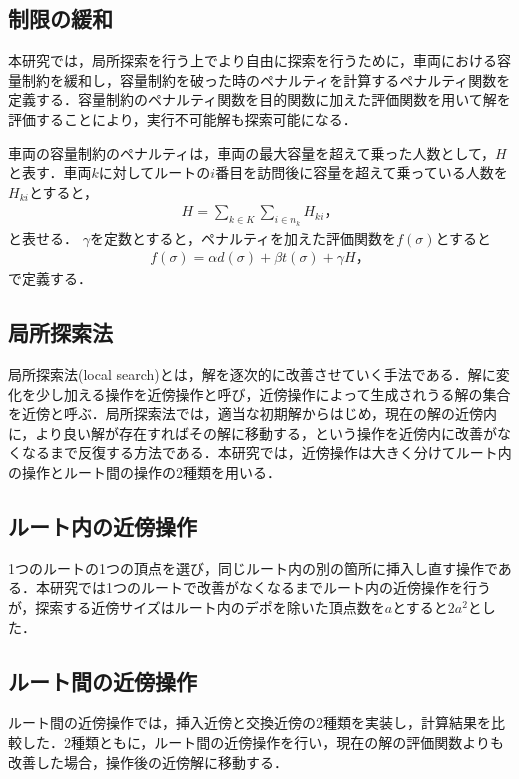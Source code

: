 \documentclass[a4j,11pt,twocolumn]{jsarticle}
\begin{document}
\subsection{{\large 制限の緩和}}
本研究では，局所探索を行う上でより自由に探索を行うために，車両における容量制約を緩和し，容量制約を破った時のペナルティを計算するペナルティ関数を定義する．容量制約のペナルティ関数を目的関数に加えた評価関数を用いて解を評価することにより，実行不可能解も探索可能になる．

車両の容量制約のペナルティは，車両の最大容量を超えて乗った人数として，$H$と表す．車両$k$に対してルートの$i$番目を訪問後に容量を超えて乗っている人数を$H_{ki}$とすると，
\begin{align*}
  H = \sum_{k \in K}\sum_{i \in n_k} H_{ki}，
\end{align*}
と表せる．
$\gamma$を定数とすると，ペナルティを加えた評価関数を$f(\sigma)$とすると
\begin{align*}
  f(\sigma) = \alpha d(\sigma)+ \beta t(\sigma) + \gamma H，
\end{align*}
で定義する．

\subsection{{\large 局所探索法}}
局所探索法(local search)とは，解を逐次的に改善させていく手法である．解に変化を少し加える操作を近傍操作と呼び，近傍操作によって生成されうる解の集合を近傍と呼ぶ．局所探索法では，適当な初期解からはじめ，現在の解の近傍内に，より良い解が存在すればその解に移動する，という操作を近傍内に改善がなくなるまで反復する方法である．本研究では，近傍操作は大きく分けてルート内の操作とルート間の操作の2種類を用いる．

\subsection{{\large ルート内の近傍操作}}
1つのルートの1つの頂点を選び，同じルート内の別の箇所に挿入し直す操作である．本研究では1つのルートで改善がなくなるまでルート内の近傍操作を行うが，探索する近傍サイズはルート内のデポを除いた頂点数を$a$とすると$2a^2$とした．

\subsection{{\large ルート間の近傍操作}}
ルート間の近傍操作では，挿入近傍と交換近傍の2種類を実装し，計算結果を比較した．2種類ともに，ルート間の近傍操作を行い，現在の解の評価関数よりも改善した場合，操作後の近傍解に移動する．
\end{document}
